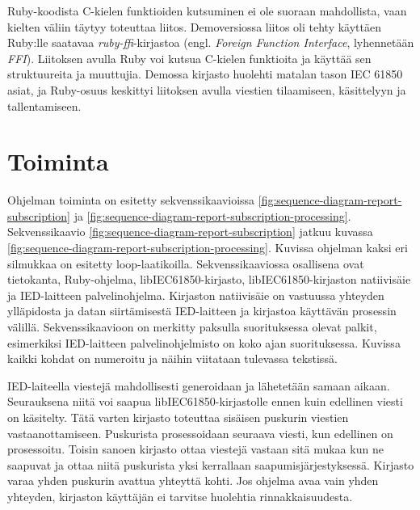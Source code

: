 Ruby-koodista C-kielen funktioiden kutsuminen ei ole suoraan mahdollista, vaan kielten väliin täytyy toteuttaa liitos. Demoversiossa liitos oli tehty käyttäen Ruby:lle saatavaa \emph{ruby-ffi}-kirjastoa \cite{ruby-ffi-repo} (engl. \emph{Foreign Function Interface}, lyhennetään \emph{FFI}). Liitoksen avulla Ruby voi kutsua C-kielen funktioita ja käyttää sen struktuureita ja muuttujia. Demossa kirjasto huolehti matalan tason IEC 61850 asiat, ja Ruby-osuus keskittyi liitoksen avulla viestien tilaamiseen, käsittelyyn ja tallentamiseen.


\section{Toiminta}
\label{ch:ongelmakohdat-ja-analysointi}
Ohjelman toiminta on esitetty sekvenssikaavioissa \ref{fig:sequence-diagram-report-subscription} ja \ref{fig:sequence-diagram-report-subscription-processing}. Sekvenssikaavio \ref{fig:sequence-diagram-report-subscription} jatkuu kuvassa \ref{fig:sequence-diagram-report-subscription-processing}. Kuvissa ohjelman kaksi eri silmukkaa on esitetty loop-laatikoilla. Sekvenssikaaviossa osallisena ovat tietokanta, Ruby-ohjelma, libIEC61850-kirjasto, libIEC61850-kirjaston natiivisäie ja IED-laitteen palvelinohjelma. Kirjaston natiivisäie on vastuussa yhteyden ylläpidosta ja datan siirtämisestä IED-laitteen ja kirjastoa käyttävän prosessin välillä. Sekvenssikaavioon on merkitty paksulla suorituksessa olevat palkit, esimerkiksi IED-laitteen palvelinohjelmisto on koko ajan suorituksessa. Kuvissa kaikki kohdat on numeroitu ja näihin viitataan tulevassa tekstissä.

IED-laiteella viestejä mahdollisesti generoidaan ja lähetetään samaan aikaan. Seurauksena niitä voi saapua libIEC61850-kirjastolle ennen kuin edellinen viesti on käsitelty. Tätä varten kirjasto toteuttaa sisäisen puskurin viestien vastaanottamiseen. Puskurista prosessoidaan seuraava viesti, kun edellinen on prosessoitu. Toisin sanoen kirjasto ottaa viestejä vastaan sitä mukaa kun ne saapuvat ja ottaa niitä puskurista yksi kerrallaan saapumisjärjestyksessä. Kirjasto varaa yhden puskurin avattua yhteyttä kohti. Jos ohjelma avaa vain yhden yhteyden, kirjaston käyttäjän ei tarvitse huolehtia rinnakkaisuudesta. \cite{libIEC61850-repo}

